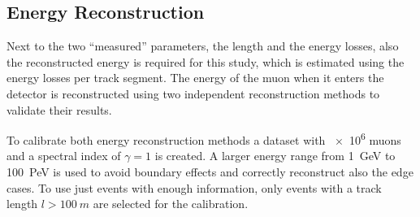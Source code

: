 %

\subsection{Energy Reconstruction}

Next to the two \enquote{measured} parameters, the length and the energy losses, also the reconstructed energy is required for this study, which is estimated using the energy losses per track segment.
The energy of the muon when it enters the detector is reconstructed using two independent reconstruction methods to validate their results.

To calibrate both energy reconstruction methods a dataset with \num{e6} muons and a spectral index of $\gamma=1$ is created.
A larger energy range from \SI{1}{GeV} to \SI{100}{PeV} is used to avoid boundary effects and correctly reconstruct also the edge cases.
To use just events with enough information, only events with a track length $l > \SI{100}{m}$ are selected for the calibration.

